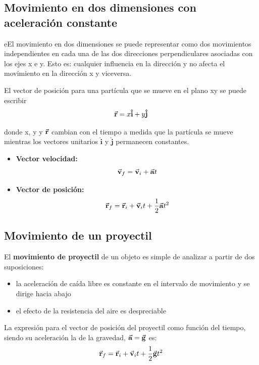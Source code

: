   \subsection{Movimiento en dos dimensiones con aceleración constante}
    \PN eEl movimiento en dos dimensiones se puede representar como dos movimientos independientes en cada una de las
    dos direcciones perpendiculares asociadas con los ejes x e y. Esto es: cualquier influencia en la dirección y no
    afecta el movimiento en la dirección x y viceversa.

    \PN El vector de posición para una partícula que se mueve en el plano xy se puede escribir
    \begin{equation*}
      \vec{\mathbf{r}} = x \mathbf{\hat{i}} + y \mathbf{\hat{j}}
    \end{equation*}

    \PN donde x, y y $\vec{\mathbf{r}}$ cambian con el tiempo a medida que la partícula se mueve mientras los vectores unitarios
    $\mathbf{\hat{i}}$ y $\mathbf{\hat{j}}$ permanecen constantes.

    \begin{itemize}
      \item \textbf{Vector velocidad:}
        \begin{equation*}
          \vec{\mathbf{v}}_{f} = \vec{\mathbf{v}}_{i} + \vec{\mathbf{a}} t
        \end{equation*}

      \item \textbf{Vector de posición:}
        \begin{equation*}
          \vec{\mathbf{r}}_{f} = \vec{\mathbf{r}}_{i} + \vec{\mathbf{v}}_{i} t + \frac{1}{2} \vec{\mathbf{a}} t^{2}
        \end{equation*}
    \end{itemize}

  \subsection{Movimiento de un proyectil}
    \PN El \textbf{movimiento de proyectil} de un objeto es simple de analizar a partir de dos suposiciones:
    \begin{itemize}
      \item la aceleración de caída libre es constante en el intervalo de movimiento y se dirige hacia abajo
      \item el efecto de la resistencia del aire es despreciable
    \end{itemize}

    \PN La expresión para el vector de posición del proyectil como función del tiempo, siendo su aceleración la de la
    gravedad, $\vec{\mathbf{a}} = \vec{\mathbf{g}}$ es:
    \begin{equation*}
      \vec{\mathbf{r}}_{f} = \vec{\mathbf{r}}_{i} + \vec{\mathbf{v}}_{i} t + \frac{1}{2} \vec{\mathbf{g}} t^{2}
    \end{equation*}

